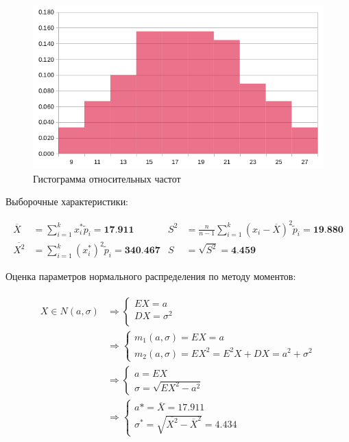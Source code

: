 \documentclass[12pt, a4paper]{article}
\begin{document}
\begin{figure}[H]
\centering
\includegraphics[scale=0.55]{2.png}
\caption{Гистограмма относительных частот}
\end{figure}

\newpage

\noindent Выборочные характеристики:

\begin{align*}
  \overline{X} &= \sum_{i=1}^k x_i^*\tilde{p}_i = \textbf{17.911} & 
  S^2 &= \frac{n}{n-1}\sum_{i=1}^{k}(x_i - \overline{X})^2\tilde{p}_i = \textbf{19.880} \\
  \overline{X^2} &= \sum_{i=1}^k (x_i^*)^2\tilde{p}_i = \textbf{340.467} & 
  S &= \sqrt{S^2} = \textbf{4.459}
\end{align*}
\vspace{5mm}

\noindent Оценка параметров нормального распределения по методу моментов:

\begin{align*}
  \begin{split}
    X \in N(a, \sigma) 
        &\Rightarrow 
        \begin{cases} 
          EX = a \\
          DX = \sigma^2 \\
        \end{cases} \\
        &\Rightarrow
        \begin{cases} 
          m_1(a, \sigma) = EX = a \\
          m_2(a, \sigma) = EX^2 = E^2X + DX = a^2 + \sigma^2
        \end{cases} \\
        &\Rightarrow
        \begin{cases} 
          a = EX \\
          \sigma = \sqrt{EX^2 - a^2}
        \end{cases} \\
        &\Rightarrow
        \begin{cases} 
          a* = \overline{X} = 17.911 \\
          \sigma^* = \sqrt{\overline{X^2} - \overline{X}^2} = 4.434
        \end{cases}
  \end{split}
\end{align*}
\vspace{5mm}
\end{document}
